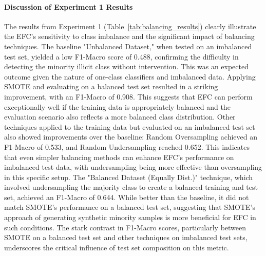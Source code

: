 \documentclass[12pt]{article}
\begin{document}
\paragraph{Discussion of Experiment 1 Results}
The results from Experiment 1 (Table~\ref{tab:balancing_results}) clearly illustrate the EFC's sensitivity to class imbalance
and the significant impact of balancing techniques. The baseline "Unbalanced Dataset," when tested on an imbalanced test
set, yielded a low F1-Macro score of 0.488, confirming the difficulty in detecting the minority illicit class without
intervention. This was an expected outcome given the nature of one-class classifiers and imbalanced data. Applying SMOTE
and evaluating on a balanced test set resulted in a striking improvement, with an F1-Macro of 0.908. This suggests that
EFC can perform exceptionally well if the training data is appropriately balanced and the evaluation scenario also reflects
a more balanced class distribution. Other techniques applied to the training data but evaluated on an imbalanced test set
also showed improvements over the baseline: Random Oversampling achieved an F1-Macro of 0.533, and Random Undersampling
reached 0.652. This indicates that even simpler balancing methods can enhance EFC's performance on imbalanced test data,
with undersampling being more effective than oversampling in this specific setup. The "Balanced Dataset (Equally Dist.)"
technique, which involved undersampling the majority class to create a balanced training and test set, achieved an F1-Macro
of 0.644. While better than the baseline, it did not match SMOTE's performance on a balanced test set, suggesting that
SMOTE's approach of generating synthetic minority samples is more beneficial for EFC in such conditions. The stark contrast
in F1-Macro scores, particularly between SMOTE on a balanced test set and other techniques on imbalanced test sets,
underscores the critical influence of test set composition on this metric.
\end{document}
